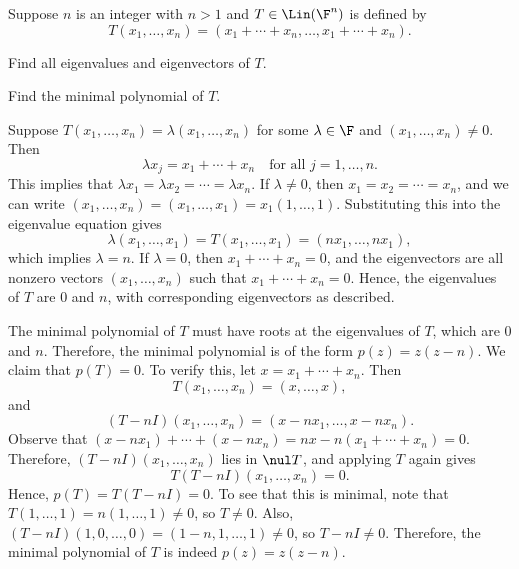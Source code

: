 \begin{exercise}
Suppose $n$ is an integer with $n>1$ and $T\in\Lin(\F^n)$ is defined by
\[ T(x_1,\dots,x_n)=(x_1+\cdots+x_n,\dots,x_1+\cdots+x_n). \]
\begin{parts}
\item Find all eigenvalues and eigenvectors of $T$.
\item Find the minimal polynomial of $T$.
\end{parts}
\end{exercise}
\begin{solution}\leavevmode
\begin{parts}
\item Suppose $T(x_1,\dots,x_n)=\lambda(x_1,\dots,x_n)$ for some
  $\lambda\in\F$ and $(x_1,\dots,x_n)\ne0$. Then
  \[ \lambda x_j=x_1+\cdots+x_n \quad\text{for all } j=1,\dots,n. \]
  This implies that $\lambda x_1=\lambda x_2=\cdots=\lambda x_n$. If
  $\lambda\ne0$, then $x_1=x_2=\cdots=x_n$, and we can write
  $(x_1,\dots,x_n)=(x_1,\dots,x_1)=x_1(1,\dots,1)$. Substituting this into the
  eigenvalue equation gives
  \[ \lambda(x_1,\dots,x_1)=T(x_1,\dots,x_1)=(nx_1,\dots,nx_1), \]
  which implies $\lambda=n$. If $\lambda=0$, then $x_1+\cdots+x_n=0$, and the
  eigenvectors are all nonzero vectors $(x_1,\dots,x_n)$ such that
  $x_1+\cdots+x_n=0$. Hence, the eigenvalues of $T$ are $0$ and $n$, with
  corresponding eigenvectors as described.
\item The minimal polynomial of $T$ must have roots at the eigenvalues of $T$,
  which are $0$ and $n$. Therefore, the minimal polynomial is of the form
  $p(z)=z(z-n)$. We claim that $p(T)=0$. To verify this, let
  $x=x_1+\cdots+x_n$. Then
  \[ T(x_1,\dots,x_n)=(x,\dots,x), \]
  and
  \[ (T-nI)(x_1,\dots,x_n)=(x-nx_1,\dots,x-nx_n). \]
  Observe that $(x-nx_1)+\cdots+(x-nx_n)=nx-n(x_1+\cdots+x_n)=0$. Therefore,
  $(T-nI)(x_1,\dots,x_n)$ lies in $\nul T$, and applying $T$ again gives
  \[ T(T-nI)(x_1,\dots,x_n)=0. \]
  Hence, $p(T)=T(T-nI)=0$. To see that this is minimal, note that
  $T(1,\dots,1)=n(1,\dots,1)\ne0$, so $T\ne0$. Also,
  $(T-nI)(1,0,\dots,0)=(1-n,1,\dots,1)\ne0$, so $T-nI\ne0$. Therefore, the
  minimal polynomial of $T$ is indeed $p(z)=z(z-n)$. \qedhere
\end{parts}
\end{solution}

